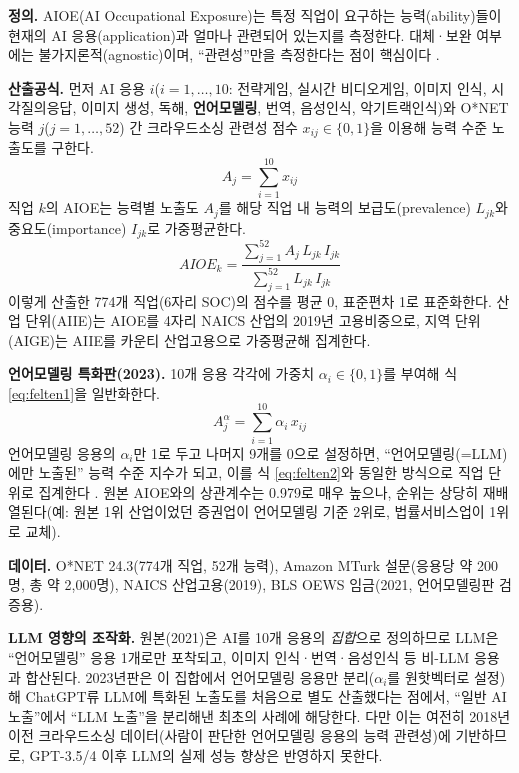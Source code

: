 \documentclass[11pt]{article}
\begin{document}
\textbf{정의.} AIOE(AI Occupational Exposure)는 특정 직업이 요구하는 능력(ability)들이 현재의 AI 응용(application)과 얼마나 관련되어 있는지를 측정한다. 대체·보완 여부에는 불가지론적(agnostic)이며, ``관련성''만을 측정한다는 점이 핵심이다 \parencite{felten-2021-occupational-industry-and-geographic-exposure}.

\textbf{산출공식.} 먼저 AI 응용 $i$($i=1,\dots,10$: 전략게임, 실시간 비디오게임, 이미지 인식, 시각질의응답, 이미지 생성, 독해, \textbf{언어모델링}, 번역, 음성인식, 악기트랙인식)와 O*NET 능력 $j$($j=1,\dots,52$) 간 크라우드소싱 관련성 점수 $x_{ij}\in\{0,1\}$을 이용해 능력 수준 노출도를 구한다.
\begin{equation}
A_{j} = \sum_{i=1}^{10} x_{ij}
\label{eq:felten1}
\end{equation}
직업 $k$의 AIOE는 능력별 노출도 $A_j$를 해당 직업 내 능력의 보급도(prevalence) $L_{jk}$와 중요도(importance) $I_{jk}$로 가중평균한다.
\begin{equation}
AIOE_k = \frac{\sum_{j=1}^{52} A_{j}\, L_{jk}\, I_{jk}}{\sum_{j=1}^{52} L_{jk}\, I_{jk}}
\label{eq:felten2}
\end{equation}
이렇게 산출한 774개 직업(6자리 SOC)의 점수를 평균 0, 표준편차 1로 표준화한다. 산업 단위(AIIE)는 AIOE를 4자리 NAICS 산업의 2019년 고용비중으로, 지역 단위(AIGE)는 AIIE를 카운티 산업고용으로 가중평균해 집계한다.

\textbf{언어모델링 특화판(2023).} 10개 응용 각각에 가중치 $\alpha_i\in\{0,1\}$를 부여해 식 \eqref{eq:felten1}을 일반화한다.
\begin{equation}
A_{j}^{\alpha} = \sum_{i=1}^{10} \alpha_i\, x_{ij}
\label{eq:felten3}
\end{equation}
언어모델링 응용의 $\alpha_i$만 1로 두고 나머지 9개를 0으로 설정하면, ``언어모델링(=LLM)에만 노출된'' 능력 수준 지수가 되고, 이를 식 \eqref{eq:felten2}와 동일한 방식으로 직업 단위로 집계한다 \parencite{felten-2023-how-will-language-modelers-like-chatgpt}. 원본 AIOE와의 상관계수는 0.979로 매우 높으나, 순위는 상당히 재배열된다(예: 원본 1위 산업이었던 증권업이 언어모델링 기준 2위로, 법률서비스업이 1위로 교체).

\textbf{데이터.} O*NET 24.3(774개 직업, 52개 능력), Amazon MTurk 설문(응용당 약 200명, 총 약 2,000명), NAICS 산업고용(2019), BLS OEWS 임금(2021, 언어모델링판 검증용).

\textbf{LLM 영향의 조작화.} 원본(2021)은 AI를 10개 응용의 \emph{집합}으로 정의하므로 LLM은 ``언어모델링'' 응용 1개로만 포착되고, 이미지 인식·번역·음성인식 등 비-LLM 응용과 합산된다. 2023년판은 이 집합에서 언어모델링 응용만 분리($\alpha_i$를 원핫벡터로 설정)해 ChatGPT류 LLM에 특화된 노출도를 처음으로 별도 산출했다는 점에서, ``일반 AI 노출''에서 ``LLM 노출''을 분리해낸 최초의 사례에 해당한다. 다만 이는 여전히 2018년 이전 크라우드소싱 데이터(사람이 판단한 언어모델링 응용의 능력 관련성)에 기반하므로, GPT-3.5/4 이후 LLM의 실제 성능 향상은 반영하지 못한다.
\end{document}

